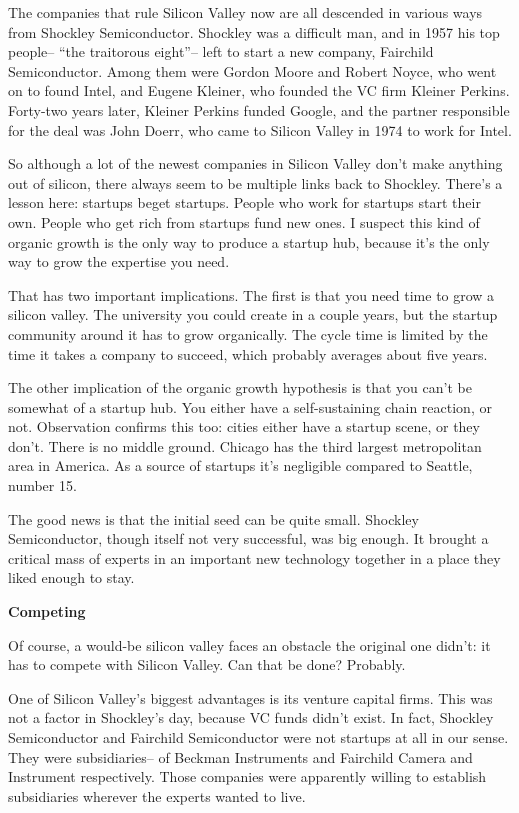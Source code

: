\documentclass[12pt]{book}
\begin{document}
The companies that rule Silicon Valley now are all descended in various
ways from Shockley Semiconductor. Shockley was a difficult man, and in
1957 his top people-- ``the traitorous eight''-- left to start a new
company, Fairchild Semiconductor. Among them were Gordon Moore and
Robert Noyce, who went on to found Intel, and Eugene Kleiner, who
founded the VC firm Kleiner Perkins. Forty-two years later, Kleiner
Perkins funded Google, and the partner responsible for the deal was John
Doerr, who came to Silicon Valley in 1974 to work for Intel.

So although a lot of the newest companies in Silicon Valley don't make
anything out of silicon, there always seem to be multiple links back to
Shockley. There's a lesson here: startups beget startups. People who
work for startups start their own. People who get rich from startups
fund new ones. I suspect this kind of organic growth is the only way to
produce a startup hub, because it's the only way to grow the expertise
you need.

That has two important implications. The first is that you need time to
grow a silicon valley. The university you could create in a couple
years, but the startup community around it has to grow organically. The
cycle time is limited by the time it takes a company to succeed, which
probably averages about five years.

The other implication of the organic growth hypothesis is that you can't
be somewhat of a startup hub. You either have a self-sustaining chain
reaction, or not. Observation confirms this too: cities either have a
startup scene, or they don't. There is no middle ground. Chicago has the
third largest metropolitan area in America. As a source of startups it's
negligible compared to Seattle, number 15.

The good news is that the initial seed can be quite small. Shockley
Semiconductor, though itself not very successful, was big enough. It
brought a critical mass of experts in an important new technology
together in a place they liked enough to stay.

\textbf{Competing}

Of course, a would-be silicon valley faces an obstacle the original one
didn't: it has to compete with Silicon Valley. Can that be done?
Probably.

One of Silicon Valley's biggest advantages is its venture capital firms.
This was not a factor in Shockley's day, because VC funds didn't exist.
In fact, Shockley Semiconductor and Fairchild Semiconductor were not
startups at all in our sense. They were subsidiaries-- of Beckman
Instruments and Fairchild Camera and Instrument respectively. Those
companies were apparently willing to establish subsidiaries wherever the
experts wanted to live.
\end{document}
